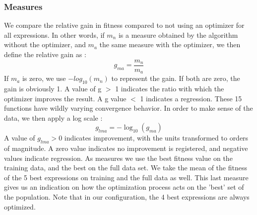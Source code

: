 \subsubsection{Measures}
We compare the relative gain in fitness compared to not using an optimizer for all expressions. 
In other words, if $m_n$ is a measure obtained by the algorithm without the optimizer, and $m_a$ the same measure with the optimizer, we then define the relative gain as :
\[
g_{ma} = \frac{m_n}{m_a}
\]
If $m_a$ is zero, we use $-log_{10}(m_n)$ to represent the gain. If both are zero, the gain is obviously 1. A value of g $>$ 1 indicates the ratio with which the optimizer improves the result. A g value $<$ 1 indicates a regression.
These 15 functions have wildly varying convergence behavior. In order to make sense of the data, we then apply a log scale :
\[
g_{lma} = - \log_{10}(g_{ma})
\]
A value of $g_{lma} > 0 $ indicates improvement, with the units transformed to orders of magnitude. A zero value indicates no improvement is registered, and negative values indicate regression. 
As measures we use the best fitness value on the training data, and the best on the full data set. We take the mean of the fitness of the 5 best expressions on training and the full data as well. This last measure gives us an indication on how the optimization process acts on the 'best' set of the population. Note that in our configuration, the 4 best expressions are always optimized.
